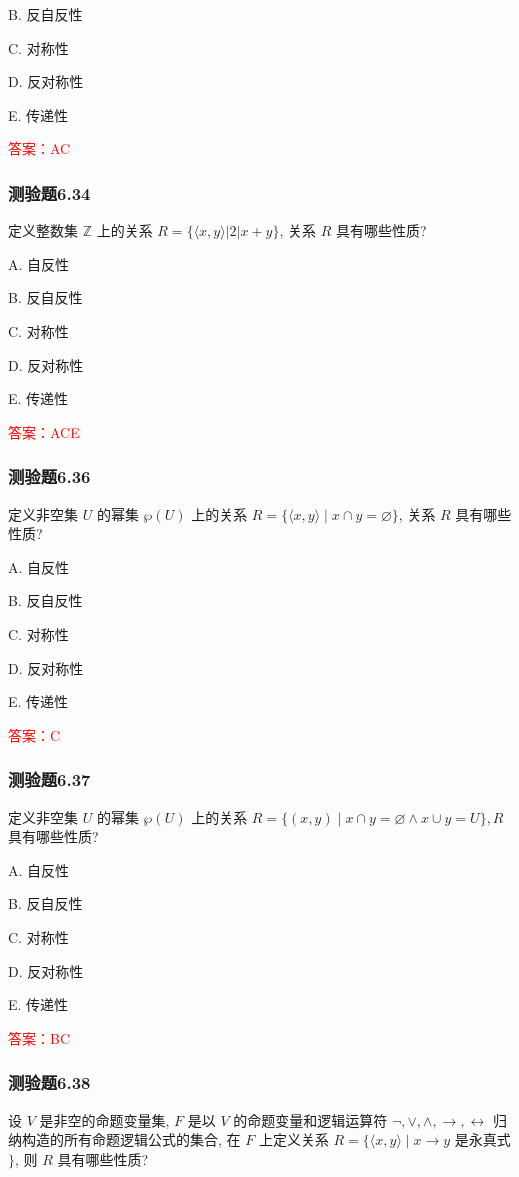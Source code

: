 \documentclass[UTF8, heading=true]{ctexart}
\begin{document}
B. 
反自反性

C. 
对称性

D. 
反对称性

E. 
传递性

\textcolor{red}{答案：AC}

\subsubsection{测验题6.34}

定义整数集 $\mathbb{Z}$ 上的关系 $R=\{\langle x, y\rangle|2| x+y\}$, 关系 $R$ 具有哪些性质?

A. 
自反性

B. 
反自反性

C. 
对称性

D. 
反对称性

E. 
传递性

\textcolor{red}{答案：ACE}

\subsubsection{测验题6.36}
定义非空集 $U$ 的幂集 $\wp(U)$ 上的关系 $R=\{\langle x, y\rangle \mid x \cap y=\varnothing\}$, 关系 $R$ 具有哪些性质?

A. 
自反性

B. 
反自反性

C. 
对称性

D. 
反对称性

E. 
传递性

\textcolor{red}{答案：C}

\subsubsection{测验题6.37}
定义非空集 $U$ 的幂集 $\wp(U)$ 上的关系 $R=\{(x, y) \mid x \cap y=\varnothing \wedge x \cup y=U\}, R$ 具有哪些性质?

A. 
自反性

B. 
反自反性

C. 
对称性

D. 
反对称性

E. 
传递性

\textcolor{red}{答案：BC}

\subsubsection{测验题6.38}

设 $V$ 是非空的命题变量集, $F$ 是以 $V$ 的命题变量和逻辑运算符 $\neg, \vee, \wedge, \rightarrow, \leftrightarrow$ 归纳构造的所有命题逻辑公式的集合, 在 $F$ 上定义关系 $R=\{\langle x, y\rangle \mid x \rightarrow y$ 是永真式 $\}$, 则 $R$ 具有哪些性质?
\end{document}
